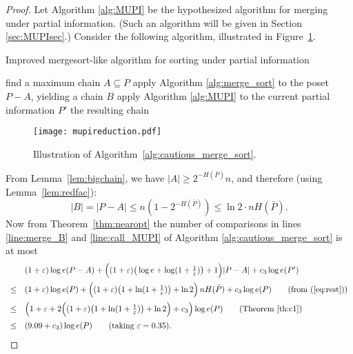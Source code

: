 \documentclass{article} \usepackage{fullpage}
\begin{document}
\begin{proof}
Let Algorithm \ref{alg:MUPI} be the hypothesized algorithm for merging under partial information. 
(Such an algorithm will be given in Section \ref{sec:MUPIsec}.) 
Consider the following algorithm, illustrated in Figure~\ref{fig:mupireduction}.

\begin{algorithm}[h!]
\caption{Improved mergesort-like algorithm for sorting under partial information} \label{alg:cautious_merge_sort}
\begin{algorithmic}[1]
\STATE find a maximum chain $A \subseteq P$
\STATE \label{line:merge_B} apply Algorithm \ref{alg:merge_sort} to the poset $P - A$, yielding a chain $B$
\STATE \label{line:call_MUPI} apply Algorithm \ref{alg:MUPI} to the current partial information $P'$
\RETURN the resulting chain
\end{algorithmic}
\end{algorithm}

\begin{figure}
\begin{center}
\texttt{[image: mupireduction.pdf]}
\end{center}
\caption{\label{fig:mupireduction}Illustration of Algorithm~\ref{alg:cautious_merge_sort}.}
\end{figure}

From Lemma~\ref{lem:bigchain}, we have $|A|\geq 2^{-H(\bar P)} n$, and therefore (using Lemma~\ref{lem:redfac}):
\begin{equation}
\label{eq:rest}
|B| = |P-A| \leq n (1-2^{-H(\bar P)}) \leq \ln 2 \cdot nH(\bar P) .
\end{equation}
Now from Theorem~\ref{thm:nearopt} the number of comparisons in lines \ref{line:merge_B} and \ref{line:call_MUPI} of Algorithm \ref{alg:cautious_merge_sort} is at most
$$
\begin{array}{cl}
& (1+\varepsilon) \log e(P-A) + \Big( (1+\varepsilon)\big(\log e + \log (1 + \frac{1}{\varepsilon})\big) + 1 \Big) |P-A| + c_3 \log e(P')\\[2ex]
\leq & (1+\varepsilon) \log e(P) + \Big( (1+\varepsilon)\big(1 + \ln (1 + \frac{1}{\varepsilon})\big) + \ln 2 \Big)\,nH(\bar P) + c_3 \log e(P) \qquad \text{(from (\ref{eq:rest}))}\\[2ex]
\leq & \Big( 1 + \varepsilon + 2 \Big( (1+\varepsilon)\big(1 + \ln (1 + \frac{1}{\varepsilon})\big) + \ln 2 \Big) + c_3\Big) \log e(P) \qquad \text{(Theorem~\ref{th:c1})}\\[2ex]
\leq & (9.09 + c_3) \log e(P) \qquad \text{(taking $\varepsilon = 0.35$)}.
\end{array}
$$
\end{proof}
\end{document}
